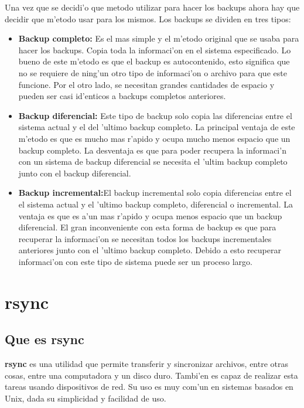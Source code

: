 \documentclass[11pt]{article}
\newcommand{\rsync}[0]{\textbf{rsync}}
\newcommand{\customitem}[1]{\item \textbf{#1:}}
\begin{document}
		Una vez que se decidi'o que metodo utilizar para hacer los backups ahora hay que decidir que m'etodo usar para los mismos. Los backups se dividen en tres tipos:
		\begin{itemize}
			\customitem{Backup completo} Es el mas simple y el m'etodo original que se usaba para hacer los backups. Copia toda la informaci'on en el sistema especificado. Lo bueno de este m'etodo es que el backup es autocontenido, esto significa que no se requiere de ning'un otro tipo de informaci'on o archivo para que este funcione. Por el otro lado, se necesitan grandes cantidades de espacio y pueden ser casi id'enticos a backups completos anteriores.
			\customitem{Backup diferencial} Este tipo de backup solo copia las diferencias entre el sistema actual y el del 'ultimo backup completo. La principal ventaja de este m'etodo es que es mucho mas r'apido y ocupa mucho menos espacio que un backup completo. La desventaja es que para poder recupera la informaci'n con un sistema de backup diferencial se necesita el 'ultim backup completo junto con el backup diferencial.
			\customitem{Backup incremental}El backup incremental solo copia diferencias entre el el sistema actual y el 'ultimo backup completo, diferencial o incremental. La ventaja es que es a'un mas r'apido y ocupa menos espacio que un backup diferencial. El gran inconveniente con esta forma de backup es que para recuperar la informaci'on se necesitan todos los backups incrementales anteriores junto con el 'ultimo backup completo. Debido a esto recuperar informaci'on con este tipo de sistema puede ser un proceso largo.
		\end{itemize}


	\section{rsync}
	\subsection{Que es rsync}
		\rsync{} es una utilidad que permite transferir y sincronizar archivos, entre otras cosas, entre una computadora y un disco duro. Tambi'en es capaz de realizar esta tareas usando dispositivos de red. Su uso es muy com'un en sistemas basados en Unix, dada su simplicidad y facilidad de uso.
\end{document}
